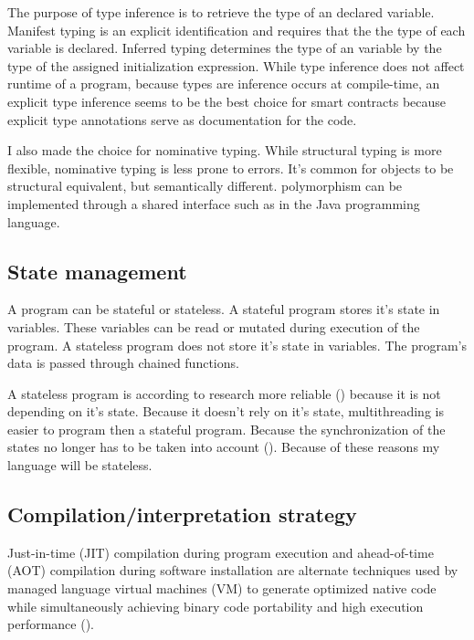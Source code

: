 \documentclass{uva-inf-article}
\begin{document}
\par The purpose of type inference is to retrieve the type of an declared variable.
Manifest typing is an explicit identification and requires that the the type of each variable is declared.
Inferred typing determines the type of an variable by the type of the assigned initialization expression.
While type inference does not affect runtime of a program, because types are inference occurs at compile-time,
an explicit type inference seems to be the best choice for smart contracts because  
explicit type annotations serve as documentation for the code.
\vspace{5mm}

\par I also made the choice for nominative typing. 
While structural typing is more flexible, nominative typing is less prone to errors.
It's common for objects to be structural equivalent, but semantically different.
polymorphism can be implemented through a shared interface such as in the Java programming language.

\subsection{State management}
\par A program can be stateful or stateless. A stateful program stores it's state in variables.
These variables can be read or mutated during execution of the program.
A stateless program does not store it's state in variables. 
The program's data is passed through chained functions.\vspace{5mm}

\par A stateless program is according to research more reliable (\cite{Merelo2018}) because it is not depending on it's state.
Because it doesn't rely on it's state, multithreading is easier to program then a stateful program. 
Because the synchronization of the states no longer has to be taken into account (\cite{Merelo2018}).
Because of these reasons my language will be stateless.

\newpage
\subsection{Compilation/interpretation strategy}
\par Just-in-time (JIT) compilation during program execution and ahead-of-time (AOT) compilation during 
software installation are alternate techniques used by managed language virtual machines (VM) to 
generate optimized native code while simultaneously achieving binary code portability and 
high execution performance (\cite{wade2017aot}).
\vspace{5mm}
\end{document}
